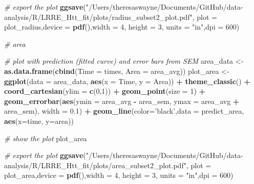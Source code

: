\documentclass[]{article}
\newenvironment{Shaded}{\begin{snugshade}}{\end{snugshade}}
\newcommand{\CommentTok}[1]{\textcolor[rgb]{0.56,0.35,0.01}{\textit{#1}}}
\newcommand{\DataTypeTok}[1]{\textcolor[rgb]{0.13,0.29,0.53}{#1}}
\newcommand{\DecValTok}[1]{\textcolor[rgb]{0.00,0.00,0.81}{#1}}
\newcommand{\FloatTok}[1]{\textcolor[rgb]{0.00,0.00,0.81}{#1}}
\newcommand{\KeywordTok}[1]{\textcolor[rgb]{0.13,0.29,0.53}{\textbf{#1}}}
\newcommand{\NormalTok}[1]{#1}
\newcommand{\OperatorTok}[1]{\textcolor[rgb]{0.81,0.36,0.00}{\textbf{#1}}}
\newcommand{\StringTok}[1]{\textcolor[rgb]{0.31,0.60,0.02}{#1}}
\begin{document}
\begin{Shaded}
\begin{Highlighting}[]
\CommentTok{# export the plot}
\KeywordTok{ggsave}\NormalTok{(}\StringTok{"/Users/theresaswayne/Documents/GitHub/data-analysis/R/LRRE_Htt_fit/plots/radius_subset2_plot.pdf"}\NormalTok{, }\DataTypeTok{plot =}\NormalTok{ plot_radius,}\DataTypeTok{device =} \KeywordTok{pdf}\NormalTok{(),}\DataTypeTok{width =} \DecValTok{4}\NormalTok{, }\DataTypeTok{height =} \DecValTok{3}\NormalTok{, }\DataTypeTok{units =} \StringTok{"in"}\NormalTok{,}\DataTypeTok{dpi =} \DecValTok{600}\NormalTok{)}

\CommentTok{# area }

\CommentTok{# plot with prediction (fitted curve) and error bars from SEM}
\NormalTok{area_data <-}\StringTok{ }\KeywordTok{as.data.frame}\NormalTok{(}\KeywordTok{cbind}\NormalTok{(}\DataTypeTok{Time =}\NormalTok{ times, }\DataTypeTok{Area =}\NormalTok{ area_avg))}
\NormalTok{plot_area <-}\StringTok{ }\KeywordTok{ggplot}\NormalTok{(}\DataTypeTok{data =}\NormalTok{ area_data, }\KeywordTok{aes}\NormalTok{(}\DataTypeTok{x =}\NormalTok{ Time, }\DataTypeTok{y =}\NormalTok{ Area)) }\OperatorTok{+}
\StringTok{  }\KeywordTok{theme_classic}\NormalTok{() }\OperatorTok{+}
\StringTok{  }\KeywordTok{coord_cartesian}\NormalTok{(}\DataTypeTok{ylim =} \KeywordTok{c}\NormalTok{(}\DecValTok{0}\NormalTok{,}\DecValTok{1}\NormalTok{)) }\OperatorTok{+}
\StringTok{  }\KeywordTok{geom_point}\NormalTok{(}\DataTypeTok{size =} \DecValTok{1}\NormalTok{) }\OperatorTok{+}
\StringTok{  }\KeywordTok{geom_errorbar}\NormalTok{(}\KeywordTok{aes}\NormalTok{(}\DataTypeTok{ymin =}\NormalTok{ area_avg }\OperatorTok{-}\StringTok{ }\NormalTok{area_sem, }\DataTypeTok{ymax =}\NormalTok{ area_avg }\OperatorTok{+}\StringTok{ }\NormalTok{area_sem),}
                \DataTypeTok{width =} \FloatTok{0.1}\NormalTok{) }\OperatorTok{+}
\StringTok{  }\KeywordTok{geom_line}\NormalTok{(}\DataTypeTok{color=}\StringTok{'black'}\NormalTok{,}\DataTypeTok{data =}\NormalTok{ predict_area, }\KeywordTok{aes}\NormalTok{(}\DataTypeTok{x=}\NormalTok{time, }\DataTypeTok{y=}\NormalTok{area))}

\CommentTok{# show the plot }
\NormalTok{plot_area}

\CommentTok{# export the plot}
\KeywordTok{ggsave}\NormalTok{(}\StringTok{"/Users/theresaswayne/Documents/GitHub/data-analysis/R/LRRE_Htt_fit/plots/area_subset2_plot.pdf"}\NormalTok{, }\DataTypeTok{plot =}\NormalTok{ plot_area,}\DataTypeTok{device =} \KeywordTok{pdf}\NormalTok{(),}\DataTypeTok{width =} \DecValTok{4}\NormalTok{, }\DataTypeTok{height =} \DecValTok{3}\NormalTok{, }\DataTypeTok{units =} \StringTok{"in"}\NormalTok{,}\DataTypeTok{dpi =} \DecValTok{600}\NormalTok{)}


\end{Highlighting}
\end{Shaded}
\end{document}
